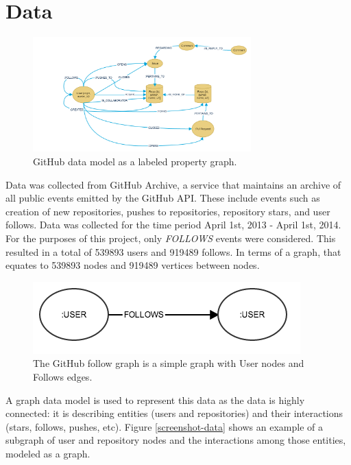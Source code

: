 \section{Data}

\begin{figure}[H]
  \centering
  \includegraphics[width=0.75\textwidth]{images/githubdatamodel.png}
  \caption[GitHub graph data model]{GitHub data model as a labeled property graph.}
  \label{fig:figures:1}
\end{figure}


Data was collected from GitHub Archive\cite{githubarchive}, a service that maintains an archive of all public events emitted by the GitHub API\cite{github:Online}. These include events such as creation of new repositories, pushes to repositories, repository stars, and user follows. Data was collected for the time period April 1st, 2013 - April 1st, 2014. For the purposes of this project, only \textit{FOLLOWS} events were considered. This resulted in a total of 539893 users and 919489 follows. In terms of a graph, that equates to 539893 nodes and 919489 vertices between nodes.

\begin{figure}[ht]
\vskip 0.2in
\begin{center}
\centerline{\includegraphics[width=0.3\columnwidth]{images/user_user.png}}
\caption[User-User data model]{The GitHub follow graph is a simple graph with User nodes and Follows edges.}
\label{fig:figures:4}
\end{center}
\vskip -0.2in
\end{figure} 

A graph data model is used to represent this data as the data is highly connected: it is describing entities (users and repositories) and their interactions (stars, follows, pushes, etc). Figure \ref{screenshot-data} shows an example of a subgraph of user and repository nodes and the interactions among those entities, modeled as a graph.

